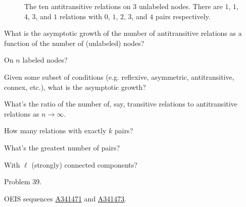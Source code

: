 \documentclass{article}
\begin{document}
\begin{figure}[ht!]
  \caption{
    The ten antitransitive relations on $3$ unlabeled nodes.
    There are
    $1$, $1$, $4$, $3$, and $1$ relations with
    $0$, $1$, $2$, $3$, and $4$ pairs respectively.
  }
\end{figure}
\begin{question}
  What is the asymptotic growth of the number of antitransitive relations as
  a function of the number of (unlabeled) nodes?
\end{question}

\begin{related}
  \item On $n$ labeled nodes?
  \item Given some subset of conditions
    (e.g. reflexive, asymmetric, antitransitive, connex, etc.), what is the
    asymptotic growth?
  \item What's the ratio of the number of, say,
    transitive relations to antitransitive relations as $n \rightarrow \infty$.
  \item How many relations with exactly $k$ pairs?
  \item What's the greatest number of pairs?
  \item With $\ell$ (strongly) connected components?
\end{related}

\begin{references}
  \item Problem 39.
  \item OEIS sequences
    \href{https://oeis.org/A341471}{A341471} and
    \href{https://oeis.org/A341473}{A341473}.
\end{references}
\end{document}
